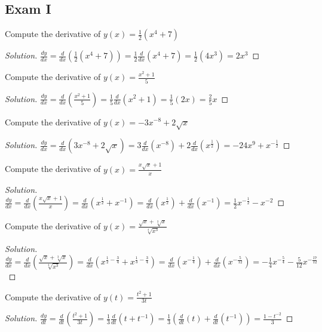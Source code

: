 \documentclass[crop=false,class=book]{standalone}
\begin{document}
\subsection{Exam I}
\begin{problem}
Compute the derivative of $y(x)=\frac{1}{2}(x^{4}+7)$
\end{problem}
\begin{proof}[Solution]
$\frac{dy}{dx}=\frac{d}{dx}(\frac{1}{2}(x^{4}+7))=\frac{1}{2}\frac{d}{dx}(x^{4}+7)=\frac{1}{2}(4x^{3})=2x^{3}$
\end{proof}
\begin{problem}
Compute the derivative of $y(x)=\frac{x^{2}+1}{5}$
\end{problem}
\begin{proof}[Solution]
$\frac{dy}{dx}=\frac{d}{dx}(\frac{x^{2}+1}{5})=\frac{1}{5}\frac{d}{dx}(x^{2}+1)=\frac{1}{5}(2x)=\frac{2}{5}x$
\end{proof}
\begin{problem}
Compute the derivative of $y(x)=-3x^{-8}+2\sqrt{x}$
\end{problem}
\begin{proof}[Solution]
$\frac{dy}{dx}=\frac{d}{dx}(3x^{-8}+2\sqrt{x})=3\frac{d}{dx}(x^{-8})+2\frac{d}{dx}(x^{\frac{1}{2}})=-24x^{9}+x^{-\frac{1}{2}}$
\end{proof}
\begin{problem}
Compute the derivative of $y(x)=\frac{x\sqrt{x}+1}{x}$
\end{problem}
\begin{proof}[Solution]
$\frac{dy}{dx}=\frac{d}{dx}(\frac{x\sqrt{x}+1}{x})=\frac{d}{dx}(x^{\frac{1}{2}}+x^{-1})=\frac{d}{dx}(x^{\frac{1}{2}})+\frac{d}{dx}(x^{-1})=\frac{1}{2}x^{-\frac{1}{2}}-x^{-2}$
\end{proof}
\begin{problem}
Compute the derivative of $y(x)=\frac{\sqrt{x}+\sqrt[3]{x}}{\sqrt[4]{x^{3}}}$
\end{problem}
\begin{proof}[Solution]
$\frac{dy}{dx}=\frac{d}{dx}(\frac{\sqrt{x}+\sqrt[3]{x}}{\sqrt[4]{x^{3}}})=\frac{d}{dx}(x^{\frac{1}{2}-\frac{3}{4}}+x^{\frac{1}{3}-\frac{3}{4}})=\frac{d}{dx}(x^{-\frac{1}{4}})+\frac{d}{dx}(x^{-\frac{5}{12}})=-\frac{1}{4}x^{-\frac{5}{4}}-\frac{5}{12}x^{-\frac{17}{12}}$
\end{proof}
\begin{problem}
Compute the derivative of $y(t)=\frac{t^{2}+1}{3t}$
\end{problem}
\begin{proof}[Solution]
$\frac{dy}{dt}=\frac{d}{dt}(\frac{t^{2}+1}{3t})=\frac{1}{3}\frac{d}{dt}(t+t^{-1})=\frac{1}{3}(\frac{d}{dt}(t)+\frac{d}{dt}(t^{-1}))=\frac{1-t^{-2}}{3}$
\end{proof}
\end{document}
